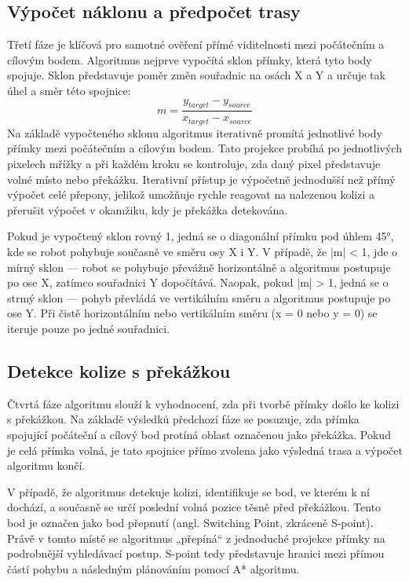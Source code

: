 \documentclass[10pt, a4paper]{article}
\begin{document}
\subsection{Výpočet náklonu a předpočet trasy}
Třetí fáze je klíčová pro samotné ověření přímé viditelnosti mezi počátečním a cílovým bodem.
Algoritmus nejprve vypočítá sklon přímky, která tyto body spojuje.
Sklon představuje poměr změn souřadnic na osách X a Y a určuje tak úhel a směr této spojnice:
$$ m = \frac{y_{target} - y_{source}}{x_{target} - x_{source}} $$
Na základě vypočteného sklonu algoritmus iterativně promítá jednotlivé body přímky mezi počátečním a cílovým bodem.
Tato projekce probíhá po jednotlivých pixelech mřížky a při každém kroku se kontroluje, zda daný pixel představuje volné místo nebo překážku.
Iterativní přístup je výpočetně jednodušší než přímý výpočet celé přepony, jelikož umožňuje rychle reagovat na nalezenou kolizi a přerušit výpočet v okamžiku, kdy je překážka detekována.

Pokud je vypočtený sklon rovný 1, jedná se o diagonální přímku pod úhlem 45°, kde se robot pohybuje současně ve směru osy X i Y.
V případě, že |m| < 1, jde o mírný sklon — robot se pohybuje převážně horizontálně a algoritmus postupuje po ose X, zatímco souřadnici Y dopočítává.
Naopak, pokud |m| > 1, jedná se o strmý sklon — pohyb převládá ve vertikálním směru a algoritmus postupuje po ose Y.
Při čistě horizontálním nebo vertikálním směru (x = 0 nebo y = 0) se iteruje pouze po jedné souřadnici.

\subsection{Detekce kolize s překážkou}
Čtvrtá fáze algoritmu slouží k vyhodnocení, zda při tvorbě přímky došlo ke kolizi s překážkou.
Na základě výsledků předchozí fáze se posuzuje, zda přímka spojující počáteční a cílový bod protíná oblast označenou jako překážka.
Pokud je celá přímka volná, je tato spojnice přímo zvolena jako výsledná trasa a výpočet algoritmu končí.

V případě, že algoritmus detekuje kolizi, identifikuje se bod, ve kterém k ní dochází, a současně se určí poslední volná pozice těsně před překážkou.
Tento bod je označen jako bod přepnutí (angl. Switching Point, zkráceně S-point).
Právě v tomto místě se algoritmus „přepíná“ z jednoduché  projekce přímky na podrobnější vyhledávací postup.
S-point tedy představuje hranici mezi přímou částí pohybu a následným plánováním pomocí A* algoritmu.
\end{document}
